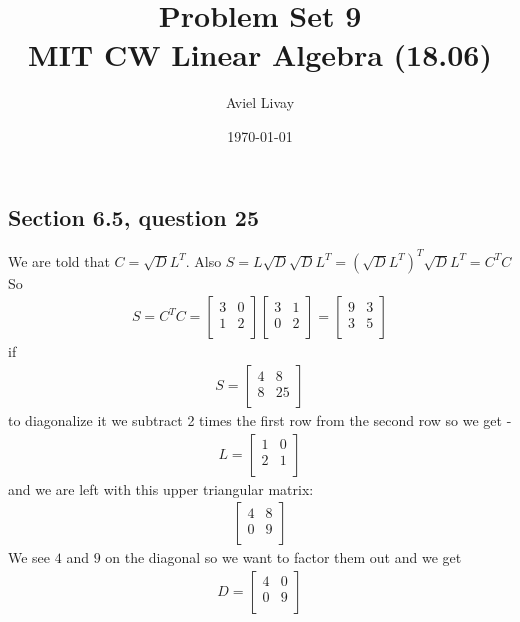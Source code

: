 \documentclass[a4paper,11pt]{article}
\title{%
	Problem Set 9\\
	\large MIT CW Linear Algebra (18.06)
}
\author{Aviel Livay}
\date{\today}
\newcommand{\?}{\stackrel{?}{=}}
\begin{document}
\maketitle

\subsection*{Section 6.5, question 25}
We are told that $C=\sqrt{D}L^T$. Also $S=L\sqrt{D}\sqrt{D}L^T=(\sqrt{D}{L^T})^T\sqrt{D}L^T=C^TC$\\
So
\begin{align*}
S=C^TC=
\begin{bmatrix}
3 & 0 \\
1 & 2 \\
\end{bmatrix}
\begin{bmatrix}
3 & 1 \\
0 & 2 \\
\end{bmatrix}
=
\begin{bmatrix}
9 & 3 \\
3 & 5 \\
\end{bmatrix}
\end{align*}
if 
\begin{align*}
S = 
\begin{bmatrix}
4 & 8 \\
8 & 25 \\
\end{bmatrix}
\end{align*}
to diagonalize it we subtract 2 times the first row from the second row so we get -  
\begin{align*}
L =
\begin{bmatrix}
1 & 0 \\
2 & 1 \\
\end{bmatrix}
\end{align*}
and we are left with this upper triangular matrix:
\begin{align*} 
\begin{bmatrix}
4 & 8 \\
0 & 9 \\
\end{bmatrix}
\end{align*}
We see $4$ and $9$ on the diagonal so we want to factor them out and we get
\begin{align*} 
D = 
\begin{bmatrix}
4 & 0 \\
0 & 9 \\
\end{bmatrix}
\end{align*}
\end{document}
